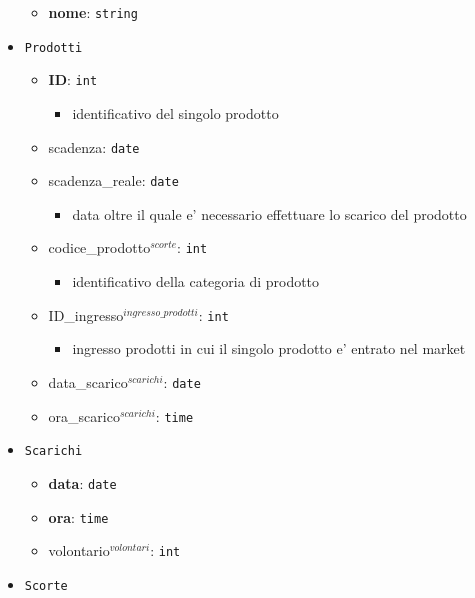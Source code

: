 \documentclass[]{article}
\providecommand{\tightlist}{%
  \setlength{\itemsep}{0pt}\setlength{\parskip}{0pt}}
\begin{document}
\begin{itemize}
  \begin{itemize}
  \tightlist
  \item
    \textbf{nome}: \texttt{string}
  \end{itemize}
\item
  \texttt{Prodotti}

  \begin{itemize}
  \tightlist
  \item
    \textbf{ID}: \texttt{int}

    \begin{itemize}
    \tightlist
    \item
      identificativo del singolo prodotto
    \end{itemize}
  \item
    scadenza: \texttt{date}
  \item
    scadenza\_reale: \texttt{date}

    \begin{itemize}
    \tightlist
    \item
      data oltre il quale e' necessario effettuare lo scarico del
      prodotto
    \end{itemize}
  \item
    codice\_prodotto\(^{scorte}\): \texttt{int}

    \begin{itemize}
    \tightlist
    \item
      identificativo della categoria di prodotto
    \end{itemize}
  \item
    ID\_ingresso\(^{ingresso\_prodotti}\): \texttt{int}

    \begin{itemize}
    \tightlist
    \item
      ingresso prodotti in cui il singolo prodotto e' entrato nel market
    \end{itemize}
  \item
    data\_scarico\(^{scarichi}\): \texttt{date}
  \item
    ora\_scarico\(^{scarichi}\): \texttt{time}
  \end{itemize}
\item
  \texttt{Scarichi}

  \begin{itemize}
  \tightlist
  \item
    \textbf{data}: \texttt{date}
  \item
    \textbf{ora}: \texttt{time}
  \item
    volontario\(^{volontari}\): \texttt{int}
  \end{itemize}
\item
  \texttt{Scorte}


\end{itemize}
\end{document}

